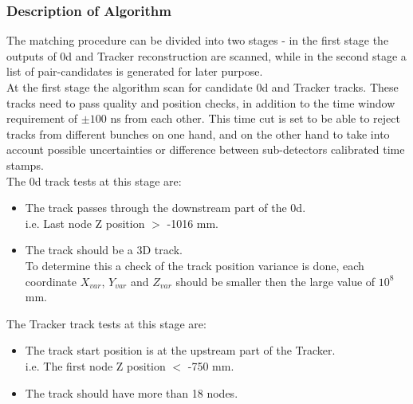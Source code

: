 \subsubsection{Description of Algorithm}

The matching procedure can be divided into two stages - in 
the first stage the outputs of \p0d and Tracker reconstruction are 
scanned, while in the second stage a list of pair-candidates 
is generated for later purpose. \\

At the first stage the algorithm scan for candidate \p0d and Tracker tracks. 
These tracks need to pass quality and position checks, 
in addition to the time window requirement of $\pm100$ ns from each other. 
This time cut is set to be able to reject tracks from different bunches 
on one hand, and on the other hand to take into account possible uncertainties 
or difference between sub-detectors calibrated time stamps.\\

The \p0d track tests at this stage are:
\begin{itemize}
\item 
The track passes through the downstream part of the \p0d. \\
i.e. Last node Z position \(>\) -1016 mm.
\item 
The track should be a 3D track. \\
To determine this a check of the track position variance is done, 
each coordinate $X_{var}$, $Y_{var}$ and $Z_{var}$ should be 
smaller then the large value of 
$10^8$ mm.
\end{itemize}

The Tracker track tests at this stage are:
\begin{itemize}
\item 
The track start position is at the upstream part of the Tracker.\\
i.e. The first node Z position \(<\) -750 mm.
\item 
The track should have more than 18 nodes.
\end{itemize}

